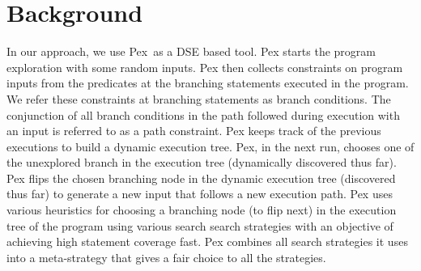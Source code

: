 \section{Background}
In our approach, we use Pex~\cite{Pex}as a DSE based tool. Pex starts the program exploration with some random inputs. Pex then collects constraints on program inputs from the predicates at the branching statements executed in the program. We refer these constraints at branching statements as branch conditions. 
The conjunction of all branch conditions in the path followed during execution with an input is referred to as a path constraint. Pex keeps track of the previous executions to build a dynamic execution tree. Pex, in the next run, chooses one of the unexplored branch in the execution tree (dynamically discovered thus far). Pex flips the chosen branching node in the dynamic execution tree (discovered thus far) to generate a new input that follows a new execution path. Pex uses various heuristics for choosing a branching node (to flip next) in the execution tree of the program using various search search strategies with an objective of achieving high statement coverage fast. Pex combines all search strategies it uses into a meta-strategy that gives a fair choice to all the strategies.
 
